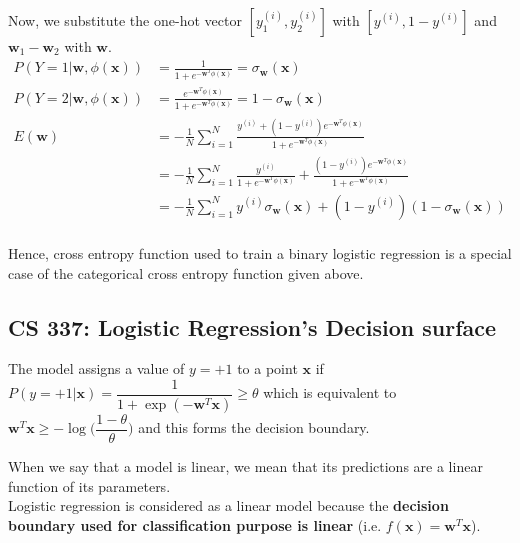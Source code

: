 \documentclass[12pt, fleqn]{article}
\begin{document}
Now, we substitute the one-hot vector $[y_1^{(i)}, y_2^{(i)}]$ with $[y^{(i)}, 1 - y^{(i)}]$ and $\mathbf{w}_1 - \mathbf{w}_2$ with $\mathbf{w}$.
\begin{equation*}
  \begin{aligned}
    P(Y = 1| \mathbf{w}, \phi(\mathbf{x})) & = \frac{1}{1 + e^{-\mathbf{w}^T \phi(\mathbf{x})}} = \sigma_\mathbf{w} (\mathbf{x})                                                                                                   \\
    P(Y = 2| \mathbf{w}, \phi(\mathbf{x})) & = \frac{e^{-\mathbf{w}^T \phi(\mathbf{x})}}{1 + e^{-\mathbf{w}^T \phi(\mathbf{x})}} = 1 - \sigma_\mathbf{w} (\mathbf{x})                                                              \\
    E(\mathbf{w})                          & = - \frac{1}{N} \sum_{i=1}^N \frac{y^{(i)} + (1 - y^{(i)}) e^{-\mathbf{w}^T \phi(\mathbf{x})}}{1 + e^{-\mathbf{w}^T \phi(\mathbf{x})}}                                                \\
                                           & = - \frac{1}{N} \sum_{i=1}^N \frac{y^{(i)}}{1 + e^{-\mathbf{w}^T \phi(\mathbf{x})}} + \frac{(1 - y^{(i)}) e^{-\mathbf{w}^T \phi(\mathbf{x})}}{1 + e^{-\mathbf{w}^T \phi(\mathbf{x})}} \\
                                           & = - \frac{1}{N} \sum_{i=1}^N y^{(i)} \sigma_\mathbf{w} (\mathbf{x}) + (1 - y^{(i)})(1 - \sigma_\mathbf{w} (\mathbf{x}))                                                               \\
  \end{aligned}
\end{equation*}

Hence, cross entropy function used to train a binary logistic regression is a special case of the categorical cross entropy function given above.


\subsection{CS 337: Logistic Regression’s Decision surface}
The model assigns a value of $y = +1$ to a point $\mathbf{x}$ if $P(y = +1 | \mathbf{x}) = \dfrac{1}{1 + \exp (-\mathbf{w}^T \mathbf{x})} \ge \theta$ which is equivalent to $\mathbf{w}^T \mathbf{x} \ge - \log \bigg( \dfrac{1 - \theta}{\theta} \bigg)$ and this forms the decision boundary.

When we say that a model is linear, we mean that its predictions are a linear function of its parameters. \\
Logistic regression is considered as a linear model because the \textbf{decision boundary used for classification purpose is linear} (i.e. $f(\mathbf{x}) = \mathbf{w}^T \mathbf{x}$).
\end{document}
